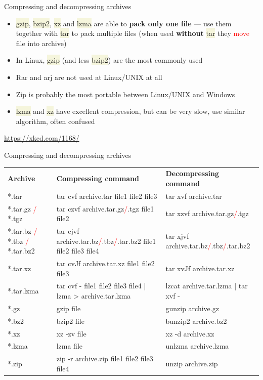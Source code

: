 \documentclass[compress, xelatex, 11pt, xcolor=svgnames, aspectratio=169,
	hyperref={
		bookmarks=true,
		unicode=true,
		colorlinks=true,
		pdftitle={Linux, command line and MetaCentrum},
		plainpages=false,
		pdfauthor={Vojtech Zeisek},
		pdfsubject={Course about use of Linux command line, writing shell scripts and using MetaCentrum of CESNET},
		pdfcreator={XeLaTeX},
		pdfkeywords={Linux, GNU, BASH, shell, command line, MetaCentrum},
		linkcolor=DarkRed, %
		anchorcolor=DarkBlue, %
		citecolor=Indigo, %
		filecolor=NavyBlue, %
		menucolor=DarkMagenta, %
		urlcolor=DarkBlue, %
		},
	url={hyphens, lowtilde} %
	]{beamer}
\renewcommand{\texttt}[1]{\colorbox{Beige}{{\ttfamily #1}}}
\renewcommand{\alert}[1]{\textcolor{red}{#1}}
\begin{document}
\begin{frame}{Compressing and decompressing archives}
	\begin{itemize}
		\item \texttt{gzip}, \texttt{bzip2}, \texttt{xz} and \texttt{lzma} are able to \textbf{pack only one file} --- use them together with \texttt{tar} to pack multiple files (when used \textbf{without} \texttt{tar} they \alert{move} file into archive)
		\item In Linux, \texttt{gzip} (and less \texttt{bzip2}) are the most commonly used
		\item Rar and arj are not used at Linux/UNIX at all
		\item Zip is probably the most portable between Linux/UNIX and Windows
		\item \texttt{lzma} and \texttt{xz} have excellent compression, but can be very slow, use similar algorithm, often confused
	\end{itemize}
		\hfill
	\begin{center}
		\texttt{[image: tar.png]}
	\end{center}
	\begin{flushright}
		\url{https://xkcd.com/1168/}
	\end{flushright}
\end{frame}

\begin{frame}{Compressing and decompressing archives}
	\begin{center}
		\begin{tabular}{m{2.25cm}m{6.3cm}m{5.3cm}}
			\textbf{Archive} & \textbf{Compressing command} & \textbf{Decompressing command}\\
			*.tar & tar cvf archive.tar file1 file2 file3 & tar xvf archive.tar\\
			*.tar.gz \alert{/} *.tgz & tar czvf archive.tar.gz\alert{/}.tgz file1 file2 & tar xzvf archive.tar.gz\alert{/}.tgz\\
			*.tar.bz \alert{/} *.tbz \alert{/} *.tar.bz2 & tar cjvf archive.tar.bz\alert{/}.tbz\alert{/}.tar.bz2 file1 file2 file3 file4 & tar xjvf archive.tar.bz\alert{/}.tbz\alert{/}.tar.bz2\\
			*.tar.xz & tar cvJf archive.tar.xz file1 file2 file3 & tar xvJf archive.tar.xz\\
			*.tar.lzma & tar cvf - file1 file2 file3 file4 | lzma > archive.tar.lzma & lzcat archive.tar.lzma | tar xvf -\\
			*.gz & gzip file & gunzip archive.gz\\
			*.bz2 & bzip2 file & bunzip2 archive.bz2\\
			*.xz & xz -zv file & xz -d archive.xz\\
			*.lzma & lzma file & unlzma archive.lzma\\
			*.zip & zip -r archive.zip file1 file2 file3 file4 & unzip archive.zip
		\end{tabular}
	\end{center}
\end{frame}
\end{document}
